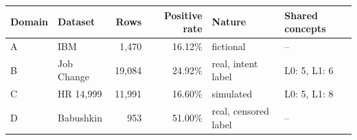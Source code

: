 \begin{tabular}{llrrll}
\hline
Domain & Dataset & Rows & Positive rate & Nature & Shared concepts \\
\hline
A & IBM & 1,470 & 16.12\% & fictional & -- \\
B & Job Change & 19,084 & 24.92\% & real, intent label & L0: 5, L1: 6 \\
C & HR 14,999 & 11,991 & 16.60\% & simulated & L0: 5, L1: 8 \\
D & Babushkin & 953 & 51.00\% & real, censored label & -- \\
\hline
\end{tabular}
